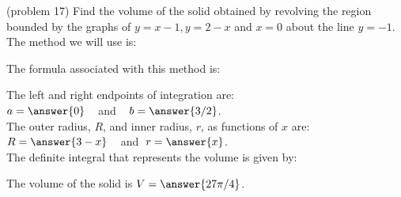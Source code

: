 \documentclass[handout]{ximera}
\begin{document}
\begin{problem}(problem 17)
Find the volume of the solid obtained by revolving the region bounded by the graphs of $y = x-1, y = 2- x$ and $x = 0$ about the line $y = -1$.\\
The method we will use is:
\begin{multipleChoice}
\end{multipleChoice}

The formula associated with this method is:
\begin{multipleChoice}
\end{multipleChoice}

The left and right endpoints of integration are:\\
$a = \answer{0}\;\;\;$ and $\;\;\; b = \answer{3/2}$.\\
The outer radius, $R$, and inner radius, $r$, as functions of $x$ are:\\
$R = \answer{3-x} \;\;\;$ and $\; r = \answer{x}$.\\

The definite integral that represents the volume is given by:\\
\begin{multipleChoice}
\end{multipleChoice}

The volume of the solid is $V = \answer{27\pi/4}$.

\end{problem}
\end{document}

